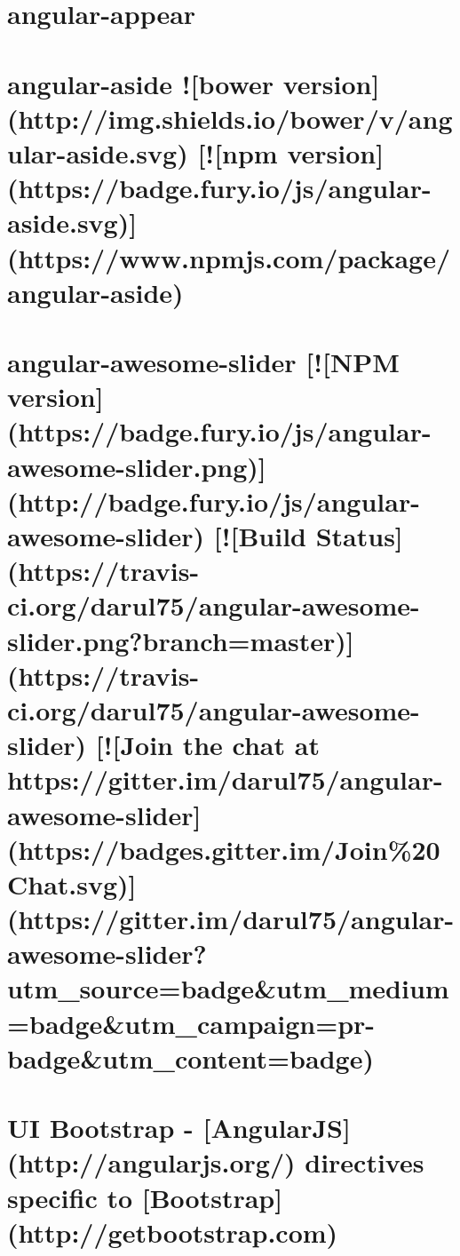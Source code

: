 \documentclass[twoside]{book}
\newcommand{\+}{\discretionary{\mbox{\scriptsize$\hookleftarrow$}}{}{}}
\begin{document}
\chapter{angular-\/appear}
\label{md_app_web_bower_components_angular-appear__r_e_a_d_m_e}

\chapter{angular-\/aside !\mbox{[}bower version\mbox{]}(http\+://img.shields.\+io/bower/v/angular-\/aside.svg) \mbox{[}!\mbox{[}npm version\mbox{]}(https\+://badge.fury.\+io/js/angular-\/aside.svg)\mbox{]}(https\+://www.npmjs.\+com/package/angular-\/aside)}
\label{md_app_web_bower_components_angular-aside__r_e_a_d_m_e}

\chapter{angular-\/awesome-\/slider \mbox{[}!\mbox{[}N\+PM version\mbox{]}(https\+://badge.fury.\+io/js/angular-\/awesome-\/slider.png)\mbox{]}(http\+://badge.fury.\+io/js/angular-\/awesome-\/slider) \mbox{[}!\mbox{[}Build Status\mbox{]}(https\+://travis-\/ci.org/darul75/angular-\/awesome-\/slider.png?branch=master)\mbox{]}(https\+://travis-\/ci.org/darul75/angular-\/awesome-\/slider) \mbox{[}!\mbox{[}Join the chat at https\+://gitter.im/darul75/angular-\/awesome-\/slider\mbox{]}(https\+://badges.gitter.\+im/\+Join\%20\+Chat.svg)\mbox{]}(https\+://gitter.im/darul75/angular-\/awesome-\/slider?utm\+\_\+source=badge\&utm\+\_\+medium=badge\&utm\+\_\+campaign=pr-\/badge\&utm\+\_\+content=badge)}
\label{md_app_web_bower_components_angular-awesome-slider__r_e_a_d_m_e}

\chapter{UI Bootstrap -\/ \mbox{[}Angular\+JS\mbox{]}(http\+://angularjs.org/) directives specific to \mbox{[}Bootstrap\mbox{]}(http\+://getbootstrap.com)}
\label{md_app_web_bower_components_angular-bootstrap__r_e_a_d_m_e}

\end{document}
